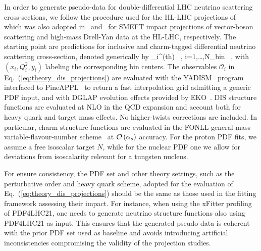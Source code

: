  In order to generate pseudo-data for double-differential
 LHC neutrino scattering cross-sections, we follow the procedure
 used for the HL-LHC projections of~\cite{AbdulKhalek:2018rok} which was
 also adopted in~\cite{Ethier:2021ydt} and~\cite{Greljo:2021kvv} for SMEFT impact projections
 of vector-boson scattering and high-mass Drell-Yan data at the HL-LHC, respectively.
 The starting point are predictions for inclusive and charm-tagged
 differential neutrino scattering cross-section, denoted generically by
 \be
 \label{eq:theory_dis_projections}
 _i^{{\rm (th)}} \equiv {} \, ,\quad
 i=1,\ldots,N_{\rm bin} \, ,
 \ee
 with $(x_i,Q^2_i,y_i)$ labeling the corresponding bin centers.
 The observables $\mathcal{O}_i $ in Eq.~(\ref{eq:theory_dis_projections})
are evaluated with the
{\sc\small YADISM}~\cite{yadism,Candido:2023utz} program
interfaced to {\sc\small PineAPPL}~\cite{Carrazza:2020gss, christopher_schwan_2023_7995675}
to return a fast interpolation grid admitting a generic PDF input,
and with DGLAP evolution effects provided by {\sc\small EKO}~\cite{Candido:2022tld}.
%
DIS structure functions are evaluated at NLO in the QCD expansion
and account both for heavy quark and target mass effects.
%
No higher-twists corrections are included.
%
In particular,
charm structure functions are evaluated in the FONLL general-mass variable-flavour-number
scheme~\cite{Forte:2010ta,Ball:2011mu,Faura:2020oom} at $\mathcal{O}\left( \alpha_s\right)$
accuracy.
%
For the proton PDF fits, we assume a free isoscalar target $N$, while
for the nuclear PDF one we allow for deviations from isoscalarity relevant
for a tungsten nucleus.

For ensure consistency, the PDF set and other theory settings, such as the perturbative
order and heavy quark scheme, adopted for the evaluation of
Eq.~(\ref{eq:theory_dis_projections}) should be the same as those
used in the fitting framework assessing their impact.
%
For instance, when using the {\sc\small xFitter} profiling of PDF4LHC21, one needs
 to generate  neutrino structure functions also using PDF4LHC21 as input.
This ensures that the generated pseudo-data is coherent with the prior PDF
 set used as baseline and avoids introducing artificial inconsistencies 
 compromising the validity of the projection studies.
 
